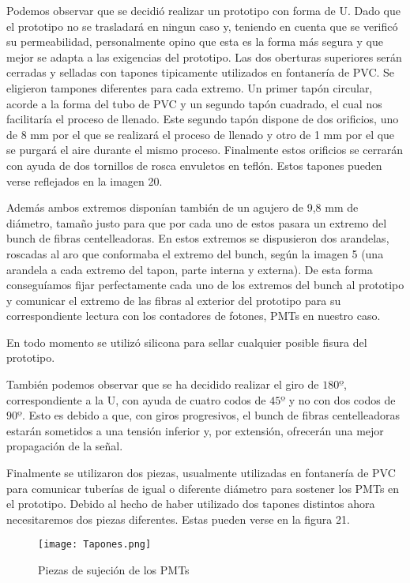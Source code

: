 Podemos observar que se decidió realizar un prototipo con forma de U. Dado que el prototipo no se trasladará en ningun caso y, teniendo en cuenta que se verificó su permeabilidad, personalmente opino que esta es la forma más segura y que mejor se adapta a las exigencias del prototipo. Las dos oberturas superiores serán cerradas y selladas con tapones tipicamente utilizados en fontanería de PVC. Se eligieron tampones diferentes para cada extremo. Un primer tapón circular, acorde a la forma del tubo de PVC y un segundo tapón cuadrado, el cual nos facilitaría el proceso de llenado. Este segundo tapón dispone de dos orificios, uno de 8 mm por el que se realizará el proceso de llenado y otro de 1 mm por el que se purgará el aire durante el mismo proceso. Finalmente estos orificios se cerrarán con ayuda de dos tornillos de rosca envuletos en teflón. Estos tapones pueden verse reflejados en la imagen 20.

Además ambos extremos disponían también de un agujero de 9,8 mm de diámetro, tamaño justo para que por cada uno de estos pasara un extremo del bunch de fibras centelleadoras. En estos extremos se dispusieron dos arandelas, roscadas al aro que conformaba el extremo del bunch, según la imagen 5 (una arandela a cada extremo del tapon, parte interna y externa). De esta forma conseguíamos fijar perfectamente cada uno de los extremos del bunch al prototipo y comunicar el extremo de las fibras al exterior del prototipo para su correspondiente lectura con los contadores de fotones, PMTs en nuestro caso. 

En todo momento se utilizó silicona para sellar cualquier posible fisura del prototipo.

También podemos observar que se ha decidido realizar el giro de $180º$, correspondiente a la U, con ayuda de cuatro codos de $45º$ y no con dos codos de $90º$. Esto es debido a que, con giros progresivos, el bunch de fibras centelleadoras estarán sometidos a una tensión inferior y, por extensión, ofrecerán una mejor propagación de la señal.

Finalmente se utilizaron dos piezas, usualmente utilizadas en fontanería de PVC para comunicar tuberías de igual o diferente diámetro para sostener los PMTs en el prototipo. Debido al hecho de haber utilizado dos tapones distintos ahora necesitaremos dos piezas diferentes. Estas pueden verse en la figura 21.

\begin{figure}[hbtp]
\centering
\texttt{[image: Tapones.png]}\\
\caption{ Piezas de sujeción de los PMTs\label{tapones}
}
\end{figure}


